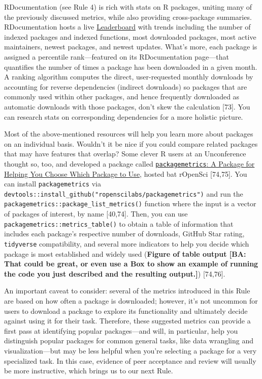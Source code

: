 \documentclass[10pt,letterpaper]{article}
\begin{document}
RDocumentation (see Rule 4) is rich with stats on R packages, uniting
many of the previously discussed metrics, while also providing
cross-package summaries. RDocumentation hosts a live
\href{https://www.rdocumentation.org/trends}{Leaderboard} with trends
including the number of indexed packages and indexed functions, most
downloaded packages, most active maintainers, newest packages, and
newest updates. What's more, each package is assigned a percentile
rank---featured on its RDocumentation page---that quantifies the number
of times a package has been downloaded in a given month. A ranking
algorithm computes the direct, user-requested monthly downloads by
accounting for reverse dependencies (indirect downloads) so packages
that are commonly used within other packages, and hence frequently
downloaded as automatic downloads with those packages, don't skew the
calculation {[}73{]}. You can research stats on corresponding
dependencies for a more holistic picture.

Most of the above-mentioned resources will help you learn more about
packages on an individual basis. Wouldn't it be nice if you could
compare related packages that may have features that overlap? Some
clever R users at an Unconference thought so, too, and developed a
package called
\href{https://docs.ropensci.org/packagemetrics/}{\texttt{packagemetrics}:
A Package for Helping You Choose Which Package to Use}, hosted bat
rOpenSci {[}74,75{]}. You can install \texttt{packagemetrics} via
\texttt{devtools::install\_github("ropenscilabs/packagemetrics")} and
run the \texttt{packagemetrics::package\_list\_metrics()} function where
the input is a vector of packages of interest, by name {[}40,74{]}.
Then, you can use \texttt{packagemetrics::metrics\_table()} to obtain a
table of information that includes each package's respective number of
downloads, GitHub Star rating, \texttt{tidyverse} compatibility, and
several more indicators to help you decide which package is most
established and widely used (\textbf{Figure of table output {[}BA: That
could be great, or even use a Box to show an example of running the code
you just described and the resulting output.{]}}) {[}74,76{]}.

An important caveat to consider: several of the metrics introduced in
this Rule are based on how often a package is downloaded; however, it's
not uncommon for users to download a package to explore its
functionality and ultimately decide against using it for their task.
Therefore, these suggested metrics can provide a first pass at
identifying popular packages---and will, in particular, help you
distinguish popular packages for common general tasks, like data
wrangling and visualization---but may be less helpful when you're
selecting a package for a very specialized task. In this case, evidence
of peer acceptance and review will usually be more instructive, which
brings us to our next Rule.
\end{document}
